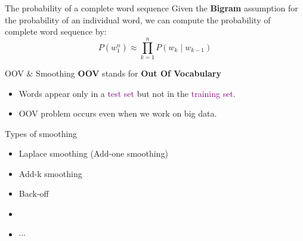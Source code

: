 \documentclass{beamer}
\begin{document}

\begin{frame}{The probability of a complete word sequence}
    Given the \textbf{Bigram} assumption for the probability of an individual word, we can compute the probability of complete word sequence by:
    $$P(w_1^n) \approx \prod_{k=1}^nP(w_k\mid w_{k-1})$$


\end{frame}


\begin{frame}{OOV \& Smoothing}
    \textbf{OOV} stands for \textbf{Out Of Vocabulary}\\
    \begin{itemize}
        \item Words appear only in a \textcolor{purple}{test set} but not in the \textcolor{purple}{training set}.
        \item OOV problem occurs even when we work on big data.
    \end{itemize}
\end{frame}

\begin{frame}{Types of smoothing}
    \begin{itemize}
        \item Laplace smoothing (Add-one smoothing)
        \item Add-k smoothing
        \item Back-off
        \item {}
        \item $\cdots$
    \end{itemize}
\end{frame}
\end{document}
